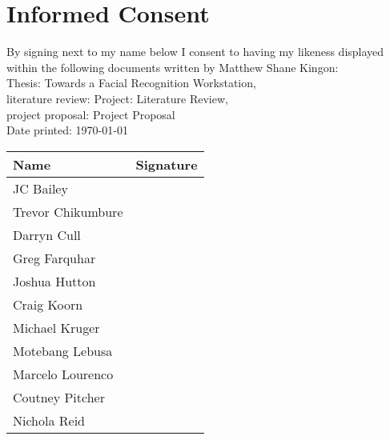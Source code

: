 \documentclass[12pt]{article}
\begin{document}
\section{Informed Consent}
By signing next to my name below I consent to having my likeness 
displayed within the following documents written by Matthew Shane Kingon: \\

Thesis:				\hspace{70px} Towards a Facial Recognition Workstation, \\
literature review:	\hspace{19px} Project: Literature Review, \\
project proposal: 	\hspace{20px} Project Proposal \\

 
Date printed: \today

\begin{table}[h!]
	\Large
		\begin{tabular}{l | r}
			Name 				& Signature \\ \hline
			JC Bailey			&           \\
			Trevor Chikumbure	&			\\
			Darryn Cull			&			\\
			Greg Farquhar		&			\\
			Joshua Hutton		&			\\
			Craig Koorn			&			\\
			Michael Kruger		&			\\
			Motebang Lebusa		&			\\
			Marcelo Lourenco	&			\\
			Coutney Pitcher 	&			\\
			Nichola Reid		&			\\
		\end{tabular}
\end{table}
\end{document}
